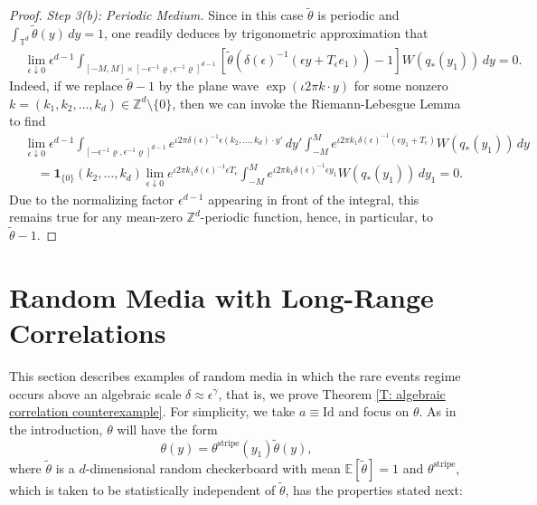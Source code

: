 \documentclass[10pt,a4paper]{amsart}
\begin{document}
\begin{proof}
	\textit{Step 3(b): Periodic Medium.} Since in this case $\tilde{\theta}$ is periodic and $\int_{\mathbb{T}^{d}} \tilde{\theta}(y) \, dy = 1$, one readily deduces by trigonometric approximation that
	\begin{align*}
		&\lim_{\epsilon \downarrow 0} \epsilon^{d-1} \int_{[-M,M] \times [-\epsilon^{-1}\varrho,\epsilon^{-1}\varrho]^{d-1}} \left[ \tilde{\theta}(\delta(\epsilon)^{-1}(\epsilon y + T_{\epsilon} e_{1} )) - 1 \right] W(q_{*}(y_{1})) \, dy = 0.
	\end{align*}
Indeed, if we replace $\tilde{\theta} - 1$ by the plane wave $\exp ( \iota 2 \pi k \cdot y )$ for some nonzero $k = (k_{1},k_{2},\dots,k_{d}) \in \mathbb{Z}^{d} \setminus \{0\}$, then we can invoke the Riemann-Lebesgue Lemma to find
	\begin{align*}
		&\lim_{\epsilon \downarrow 0} \epsilon^{d-1} \int_{[-\epsilon^{-1}\varrho,\epsilon^{-1}\varrho]^{d-1}} e^{\iota 2 \pi \delta(\epsilon)^{-1} \epsilon (k_{2},\dots,k_{d}) \cdot y'} \, dy'  \int_{-M}^{M} e^{ \iota 2 \pi k_{1} \delta(\epsilon)^{-1} ( \epsilon y_{1} + T_{\epsilon} ) } W(q_{*}(y_{1})) \, dy \\
		&\quad = \mathbf{1}_{\{0\}} (k_{2},\dots,k_{d})  \lim_{ \epsilon \downarrow 0 } e^{ \iota 2 \pi k_{1} \delta(\epsilon)^{-1} \epsilon T_{\epsilon} } \int_{-M}^{M} e^{ \iota 2 \pi k_{1} \delta(\epsilon)^{-1} \epsilon y_{1}  } W(q_{*}(y_{1})) \, dy_{1} = 0.
	\end{align*}
Due to the normalizing factor $\epsilon^{d-1}$ appearing in front of the integral, this remains true for any mean-zero $\mathbb{Z}^{d}$-periodic function, hence, in particular, to $\tilde{\theta} - 1$.\end{proof}

	
\section{Random Media with Long-Range Correlations} \label{S: long range correlations}

This section describes examples of random media in which the rare events regime occurs above an algebraic scale $\delta \approx \epsilon^{\gamma}$, that is, we prove Theorem \ref{T: algebraic correlation counterexample}.  For simplicity, we take $a \equiv \text{Id}$ and focus on $\theta$.  As in the introduction, $\theta$ will have the form
	\begin{equation*}
		\theta(y) = \theta^{\text{stripe}}(y_{1}) \tilde{\theta}(y),
	\end{equation*}
where $\tilde{\theta}$ is a $d$-dimensional random checkerboard with mean $\mathbb{E}[\tilde{\theta}] = 1$ and $\theta^{\text{stripe}}$, which is taken to be statistically independent of $\tilde{\theta}$, has the properties stated next:
\end{document}
